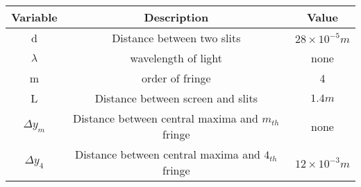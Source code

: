 \begin{tabular}{|c|c|c|}
    \hline
      \textbf{Variable}& \textbf{Description}& \textbf{Value}\\\hline
    d& Distance between two slits& $28 \times 10^{-5} m$ \\\hline
    $\lambda$& wavelength of light & none \\\hline
    m & order of fringe&4\\\hline
    L & Distance between screen and slits & $1.4m$\\\hline
    $\Delta y_m $& Distance between central maxima and $m_{th}$ fringe & none\\ 
    \hline
    $\Delta y_4 $& Distance between central maxima and $4_{th}$ fringe &$12\times 10^{-3}m$\\ 
    \hline
  \end{tabular}
